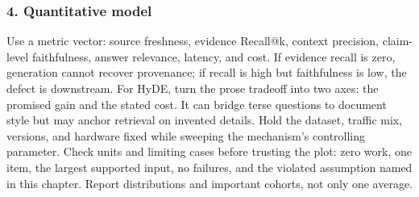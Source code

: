 \subsubsection*{4. Quantitative model}
Use a metric vector: source freshness, evidence Recall@k, context precision, claim-level faithfulness, answer relevance, latency, and cost. If evidence recall is zero, generation cannot recover provenance; if recall is high but faithfulness is low, the defect is downstream.
For HyDE, turn the prose tradeoff into two axes: the promised gain and the stated cost. It can bridge terse questions to document style but may anchor retrieval on invented details. Hold the dataset, traffic mix, versions, and hardware fixed while sweeping the mechanism's controlling parameter.
Check units and limiting cases before trusting the plot: zero work, one item, the largest supported input, no failures, and the violated assumption named in this chapter. Report distributions and important cohorts, not only one average.
